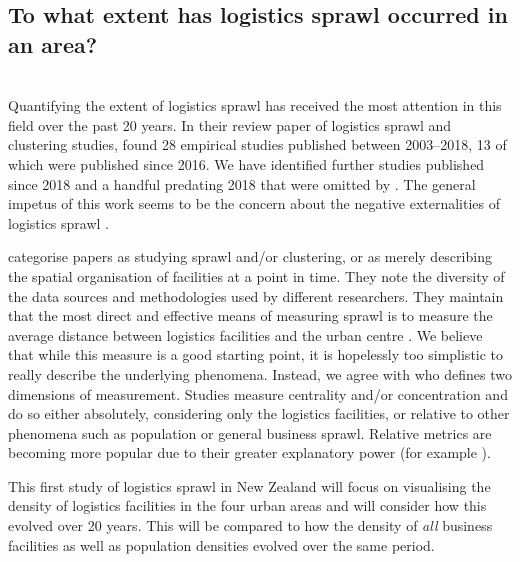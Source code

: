 \documentclass[3p, a4paper, authoryear, 11pt, fleqn, review]{elsarticle}
\newcommand{\nmt}[1]{{\color{Maroon}{~(nmt: #1)}}}
\begin{document}
\subsection{To what extent has logistics sprawl occurred in an area?}
\nmt{Draft from manuscript for the Journal of Transport Geography. It must be paraphrased / updated later.}\\
Quantifying the extent of logistics sprawl has received the most attention in this field over the past 20 years. In their review paper of logistics sprawl and clustering studies, \citet{He_etal2018} found 28 empirical studies published between 2003--2018, 13 of which were published since 2016. We have identified \nmt{xx} further studies published since 2018 and a handful predating 2018 that were omitted by \citet{He_etal2018}. The general impetus of this work seems to be the concern about the negative externalities of logistics sprawl \citep{AljohaniThompson2016, He_etal2018, Yuan2018}.

\citet{He_etal2018} categorise papers as studying sprawl and/or clustering, or as merely describing the spatial organisation of facilities at a point in time. 
They note the diversity of the data sources and methodologies used by different researchers. They maintain that the most direct and effective means of measuring sprawl is to measure the average distance between logistics facilities and the urban centre \citep{He_etal2019}. We believe that while this measure is a good starting point, it is hopelessly too simplistic to really describe the underlying phenomena. Instead, we agree with \citet{Kang2020} who defines two dimensions of measurement. Studies measure centrality and/or concentration and do so either absolutely, considering only the logistics facilities, or relative to other phenomena such as population or general business sprawl. Relative metrics are becoming more popular due to their greater explanatory power (for example \citet{Kang2020, Sakai_etal2017, Strale2020}).


This first study of logistics sprawl in New Zealand will focus on visualising the density of logistics facilities in the four urban areas and will consider how this evolved over 20 years. This will be compared to how the density of \emph{all} business facilities as well as population densities evolved over the same period. \nmt{I have started on this work already. It is my expectation that I will complete the analysis for this question. These results should offer a segue into the next section where the spatial correlation / regression work comes into play.}
\end{document}
